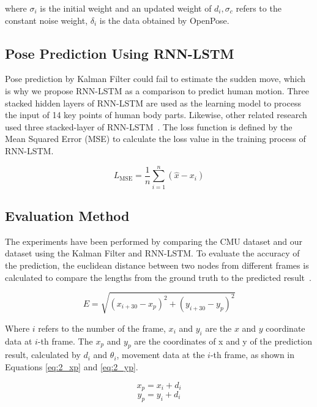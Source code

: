 where $\sigma_i$ is the initial weight and an updated weight of $d_i, \sigma_c$ refers to the constant noise weight, $\delta_i$ is the data obtained by OpenPose.

\subsection{Pose Prediction Using RNN-LSTM}\label{2:proposed_lstm}
Pose prediction by Kalman Filter could fail to estimate the sudden move, which is why we propose RNN-LSTM as a comparison to predict human motion. Three stacked hidden layers of RNN-LSTM are used as the learning model to process the input of 14 key points of human body parts. Likewise, other related research used three stacked-layer of RNN-LSTM~\cite{martinez2017, tang2018long, wu2018real}. The loss function is defined by the Mean Squared Error (MSE) to calculate the loss value in the training process of RNN-LSTM.

\begin{equation}\label{eq:MSE}
    L_\mathrm{MSE} = \frac{1}{n}\sum^n_{i=1} (\hat{x} - x_i)
\end{equation}

\subsection{Evaluation Method}\label{2:evaluationmethod}
The experiments have been performed by comparing the CMU dataset and our dataset using the Kalman Filter and RNN-LSTM. To evaluate the accuracy of the prediction, the euclidean distance between two nodes from different frames is calculated to compare the lengths from the ground truth to the predicted result~\cite{singh2021kalman}.

\begin{equation}\label{eq:2evaluation}
    E = \sqrt{(x_{i+30} - x_p)^2 + (y_{i+30} - y_p)^2}
\end{equation}

Where $i$ refers to the number of the frame, $x_i$ and $y_i$ are the $x$ and $y$ coordinate data at $i$-th frame. The $x_p$ and $y_p$ are the coordinates of x and y of the prediction result, calculated by $d_i$ and $\theta_i$, movement data at the $i$-th frame, as shown in Equations \ref{eq:2_xp} and \ref{eq:2_yp}.

\begin{equation}\label{eq:2_xp}
    x_p = x_i + d_i   
\end{equation}
\begin{equation}\label{eq:2_yp}
    y_p = y_i + d_i   
\end{equation}

